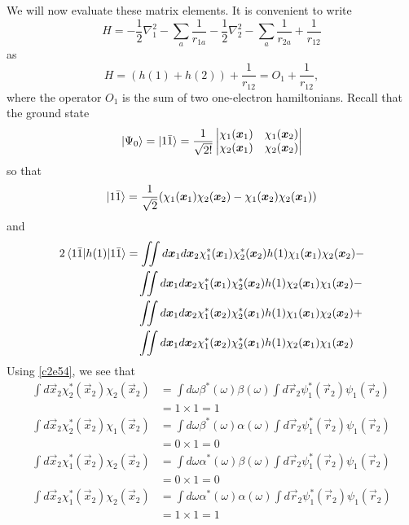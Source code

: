 We will now evaluate these matrix elements. It is convenient to write
\begin{equation}\label{c2e65}
H = -\frac{1}{2}\nabla_1^2 - \sum_a\frac{1}{r_{1a}}
    -\frac{1}{2}\nabla_2^2 - \sum_a\frac{1}{r_{2a}} + \frac{1}{r_{12}}
\end{equation}
as
\begin{equation}\label{c2e66}
H = (h(1) + h(2)) + \frac{1}{r_{12}} = O_1 + \frac{1}{r_{12}},
\end{equation}
where the operator $O_1$ is the sum of two one-electron hamiltonians. Recall 
that the ground state 
\[
\ket{\Psi_0} = \ket{1\bar{1}} = \frac{1}{\sqrt{2!}}\begin{vmatrix}
\chi_1(\bm{x}_1) & \chi_1(\bm{x}_2) \\
\chi_2(\bm{x}_1) & \chi_2(\bm{x}_2) 
\end{vmatrix}
\]
so that
\[
\ket{1\bar{1}} = \frac{1}{\sqrt{2}}(\chi_1(\bm{x}_1)\chi_2(\bm{x}_2) - 
\chi_1(\bm{x}_2)\chi_2(\bm{x}_1))
\]
and
\begin{equation}\label{c2e67}
\begin{aligned}
2\braket{1\bar{1}|h(1)|1\bar{1}} &= \iint d\bm{x}_1d\bm{x}_2
\chi_1^\ast(\bm{x}_1)\chi_2^\ast(\bm{x}_2)h(1)\chi_1(\bm{x}_1)\chi_2(\bm{x}_2)
- \\
 &\quad \iint d\bm{x}_1d\bm{x}_2
\chi_1^\ast(\bm{x}_1)\chi_2^\ast(\bm{x}_2)h(1)\chi_2(\bm{x}_1)\chi_1(\bm{x}_2)-
\\
 &\quad  \iint d\bm{x}_1d\bm{x}_2
\chi_1^\ast(\bm{x}_2)\chi_2^\ast(\bm{x}_1)h(1)\chi_1(\bm{x}_1)\chi_2(\bm{x}_2) +
\\
 &\quad  \iint d\bm{x}_1d\bm{x}_2
\chi_1^\ast(\bm{x}_2)\chi_2^\ast(\bm{x}_1)h(1)\chi_2(\bm{x}_1)\chi_1(\bm{x}_2)
\end{aligned}
\end{equation}
Using \eqref{c2e54}, we see that
\[
\begin{aligned}
\int d\vec{x}_2\chi_2^\ast(\vec{x}_2)\chi_2(\vec{x}_2) &= 
\int d\omega \beta^\ast(\omega)\beta(\omega)\int d\vec{r}_2\psi_1^\ast(\vec{r}_2)
\psi_1(\vec{r}_2) \\
 &= 1 \times 1 = 1 \\
\int d\vec{x}_2\chi_2^\ast(\vec{x}_2)\chi_1(\vec{x}_2) &= 
\int d\omega \beta^\ast(\omega)\alpha(\omega)\int d\vec{r}_2\psi_1^\ast(\vec{r}_2)
\psi_1(\vec{r}_2) \\
 &= 0 \times 1 = 0 \\
\int d\vec{x}_2\chi_1^\ast(\vec{x}_2)\chi_2(\vec{x}_2) &= 
\int d\omega \alpha^\ast(\omega)\beta(\omega)\int d\vec{r}_2\psi_1^\ast(\vec{r}_2)
\psi_1(\vec{r}_2) \\
 &= 0 \times 1 = 0 \\
\int d\vec{x}_2\chi_1^\ast(\vec{x}_2)\chi_2(\vec{x}_2) &= 
\int d\omega \alpha^\ast(\omega)\alpha(\omega)\int d\vec{r}_2\psi_1^\ast(\vec{r}_2)
\psi_1(\vec{r}_2) \\
 &= 1 \times 1 = 1 
\end{aligned}
\]
